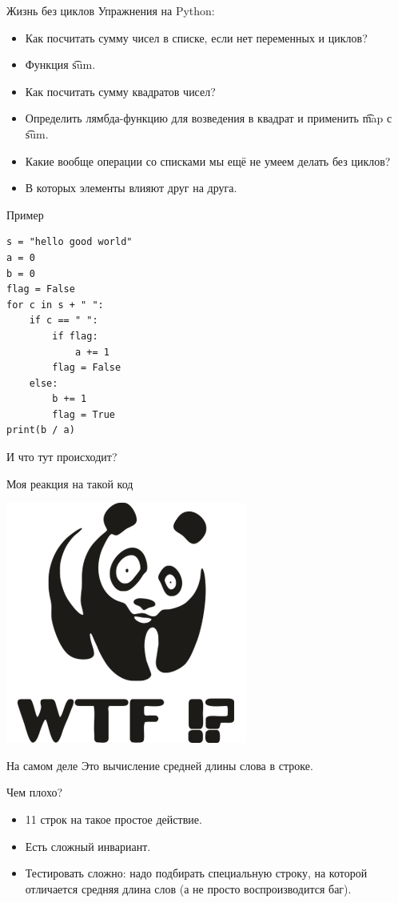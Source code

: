 \begin{frame}{Жизнь без циклов}
	Упражнения на Python:
	\begin{itemize}
		\item Как посчитать сумму чисел в списке, если нет переменных и циклов?\pause
		\item Функция \t{sum}.\pause
		\item Как посчитать сумму квадратов чисел? \pause
		\item Определить лямбда-функцию для возведения в квадрат и применить \t{map} с \t{sum}.\pause
		\item Какие вообще операции со списками мы ещё не умеем делать без циклов? \pause
		\item В которых элементы влияют друг на друга.
	\end{itemize}
\end{frame}

\begin{frame}[fragile]{Пример}
\begin{verbatim}
s = "hello good world"
a = 0
b = 0
flag = False
for c in s + " ":
    if c == " ":
        if flag:
            a += 1
        flag = False
    else:
        b += 1
        flag = True
print(b / a)
\end{verbatim}
	И что тут происходит?
\end{frame}

\begin{frame}{Моя реакция на такой код}
	\begin{center}
		\includegraphics{wtf-panda.png}
	\end{center}
\end{frame}

\begin{frame}[fragile]{На самом деле}
	Это вычисление средней длины слова в строке.

	Чем плохо?
	\begin{itemize}
		\item 11 строк на такое простое действие.
		\item Есть сложный инвариант.
		\item Тестировать сложно: надо подбирать специальную строку, на которой отличается средняя длина слов (а не просто воспроизводится баг).
	\end{itemize}
\end{frame}

